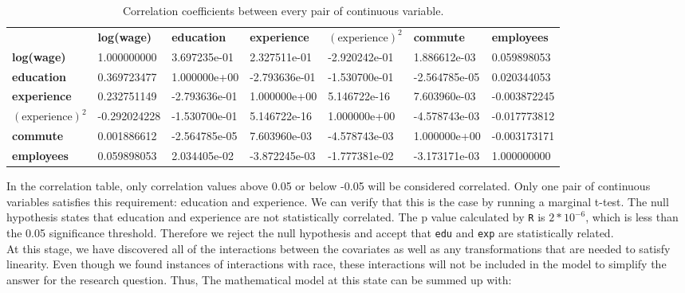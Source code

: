 \documentclass{article}
\begin{document}
      \begin{table}[H]
        \centering
        \begin{tabular}{lllllll}
                        &  \textbf{log(wage)}   &    \textbf{education}  &  \textbf{experience}   & \textbf{$(\text{experience})^2$} & \textbf{commute}       & \textbf{employees} \\
        \textbf{log(wage)}       &  1.000000000 &  3.697235e-01 &  2.327511e-01 & -2.920242e-01 & 1.886612e-03  &  0.059898053 \\
        \textbf{education}       &  0.369723477 &  1.000000e+00 & -2.793636e-01 & -1.530700e-01 & -2.564785e-05 &   0.020344053 \\
        \textbf{experience}      &  0.232751149 & -2.793636e-01 &  1.000000e+00 &  5.146722e-16 & 7.603960e-03  & -0.003872245 \\
        \textbf{$(\text{experience})^2$}  & -0.292024228 & -1.530700e-01 &  5.146722e-16 &  1.000000e+00 & -4.578743e-03 &  -0.017773812 \\
        \textbf{commute}         &  0.001886612 & -2.564785e-05 &  7.603960e-03 & -4.578743e-03 & 1.000000e+00  & -0.003173171 \\
        \textbf{employees}       &  0.059898053 &  2.034405e-02 & -3.872245e-03 & -1.777381e-02 & -3.173171e-03 &   1.000000000
        \end{tabular}
        \caption{Correlation coefficients between every pair of continuous variable.}
        \label{tab:correlated}
      \end{table}

      In the correlation table, only correlation values above 0.05 or below -0.05
      will be considered correlated. Only one pair of continuous variables satisfies
      this requirement: education and experience. We can verify that this is the
      case by running a marginal t-test. The null hypothesis states that education
      and experience are not statistically correlated. The p value calculated by \texttt{R}
      is $2 * 10^{-6}$, which is less than the 0.05 significance threshold. Therefore
      we reject the null hypothesis and accept that \texttt{edu} and \texttt{exp} are
      statistically related. \\

      At this stage, we have discovered all of the interactions between the covariates
      as well as any transformations that are needed to satisfy linearity. Even though
      we found instances of interactions with race, these interactions will not be
      included in the model to simplify the answer for the research question. Thus, The
      mathematical model at this state can be summed up with:
\end{document}
